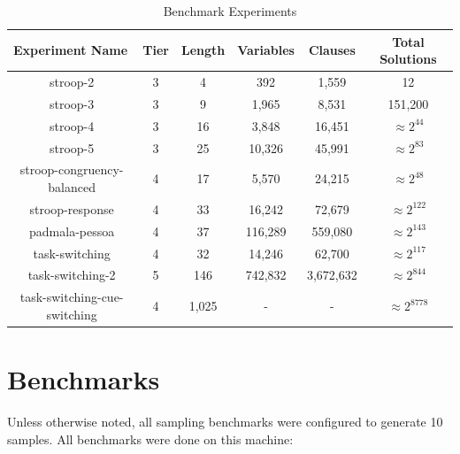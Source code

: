 \begin{table}[t]
  \centering
  \caption{Benchmark Experiments}
\begin{tabular}{|c|c|c|c|c|c|}
\hline
\multicolumn{1}{|l|}{Experiment Name} & Tier  & Length          & Variables  & Clauses    & Total Solutions    \\ \hline
stroop-2                              & 3     & 4               & 392        & 1,559      & 12                 \\ \hline
stroop-3                              & 3     & 9               & 1,965      & 8,531      & 151,200            \\ \hline
stroop-4                              & 3     & 16              & 3,848      & 16,451     & $\approx 2^{44}$   \\ \hline
stroop-5                              & 3     & 25              & 10,326     & 45,991     & $\approx 2^{83}$   \\ \hline
stroop-congruency-balanced            & 4     & 17              & 5,570      & 24,215     & $\approx 2^{48}$   \\ \hline
stroop-response                       & 4     & 33              & 16,242     & 72,679     & $\approx 2^{122}$  \\ \hline
padmala-pessoa                        & 4     & 37              & 116,289    & 559,080    & $\approx 2^{143}$  \\ \hline
task-switching                        & 4     & 32              & 14,246     & 62,700     & $\approx 2^{117}$  \\ \hline
task-switching-2                      & 5     & 146             & 742,832    & 3,672,632  & $\approx 2^{844}$  \\ \hline
task-switching-cue-switching          & 4     & 1,025           & -          & -          & $\approx 2^{8778}$ \\ \hline
\end{tabular}
\label{tab:benchmark_experiments}%
\end{table}



\section{Benchmarks}

Unless otherwise noted, all sampling benchmarks were configured to generate 10 samples. All benchmarks were done on this machine: %


